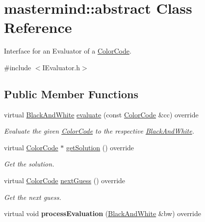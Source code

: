 \hypertarget{classmastermind_1_1abstract}{}\section{mastermind\+:\+:abstract Class Reference}
\label{classmastermind_1_1abstract}


Interface for an Evaluator of a \hyperlink{classmastermind_1_1_color_code}{Color\+Code}.  




{\ttfamily \#include $<$I\+Evaluator.\+h$>$}

\subsection*{Public Member Functions}
\begin{DoxyCompactItemize}
\item 
virtual \hyperlink{classmastermind_1_1_black_and_white}{Black\+And\+White} \hyperlink{classmastermind_1_1abstract_ad0980c8864018d4df2f5b6a05b9b64a8}{evaluate} (const \hyperlink{classmastermind_1_1_color_code}{Color\+Code} \&cc) override
\begin{DoxyCompactList}\small\item\em Evaluate the given \hyperlink{classmastermind_1_1_color_code}{Color\+Code} to the respective \hyperlink{classmastermind_1_1_black_and_white}{Black\+And\+White}. \end{DoxyCompactList}\item 
virtual \hyperlink{classmastermind_1_1_color_code}{Color\+Code} $\ast$ \hyperlink{classmastermind_1_1abstract_aeccd67ad3e6ef36834553bcdf77a4db4}{get\+Solution} () override
\begin{DoxyCompactList}\small\item\em Get the solution. \end{DoxyCompactList}\item 
virtual \hyperlink{classmastermind_1_1_color_code}{Color\+Code} \hyperlink{classmastermind_1_1abstract_a2aa68c24bf1d51834fe7c9e02d827fa7}{next\+Guess} () override
\begin{DoxyCompactList}\small\item\em Get the next guess. \end{DoxyCompactList}\item 
\hypertarget{classmastermind_1_1abstract_a8e8b6d3937e03f4bc83e4b5e988bc699}{}\label{classmastermind_1_1abstract_a8e8b6d3937e03f4bc83e4b5e988bc699} 
virtual void {\bfseries process\+Evaluation} (\hyperlink{classmastermind_1_1_black_and_white}{Black\+And\+White} \&bw) override
\end{DoxyCompactItemize}


